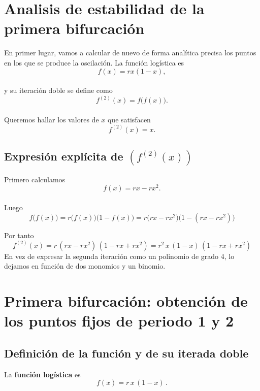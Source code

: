 \documentclass[
  10pt,
  a4paper,
  DIV=11,
  numbers=noendperiod,
  open=any]{scrreprt}
\numberwithin{equation}{chapter}
\numberwithin{equation}{chapter}
\renewcommand{\[}{\begin{equation}}
\renewcommand{\]}{\end{equation}}
\begin{document}
\section{Analisis de estabilidad de la primera
bifurcación}\label{analisis-de-estabilidad-de-la-primera-bifurcaciuxf3n}

En primer lugar, vamos a calcular de nuevo de forma analítica precisa
los puntos en los que se produce la oscilación. La función logística
es\\
\[
f(x) = rx(1 - x),
\]\\
y su iteración doble se define como\\
\[
f^{(2)}(x) = f\bigl(f(x)\bigr).
\]\\
Queremos hallar los valores de \(x\) que satisfacen\\
\[
f^{(2)}(x) = x.
\]

\subsection{\texorpdfstring{Expresión explícita de
\((f^{(2)}(x))\)}{Expresión explícita de (f\^{}\{(2)\}(x))}}\label{expresiuxf3n-expluxedcita-de-f2x}

Primero calculamos\\
\[
f(x) = r x - r x^2.
\]\\
Luego\\
\[
f\bigl(f(x)\bigr)
= r\bigl(f(x)\bigr)\bigl(1 - f(x)\bigr)
= r\bigl(r x - r x^2\bigr)\bigl(1 - (r x - r x^2)\bigr)
\]

Por tanto\\
\[
   f^{(2)}(x)
   = r\,(r x - r x^2)\,(1 - r x + r x^2)
   = r^2\,x\,(1 - x)\,(1 - r x + r x^2)
   \] En vez de expresar la segunda iteración como un polinomio de grado
4, lo dejamos en función de dos monomios y un binomio.

\section{Primera bifurcación: obtención de los puntos fijos de periodo 1
y
2}\label{primera-bifurcaciuxf3n-obtenciuxf3n-de-los-puntos-fijos-de-periodo-1-y-2}

\subsection{Definición de la función y de su iterada
doble}\label{definiciuxf3n-de-la-funciuxf3n-y-de-su-iterada-doble}

La \textbf{función logística} es\\
\[
f(x) = r\,x\,(1 - x)\,.
\]
\end{document}
